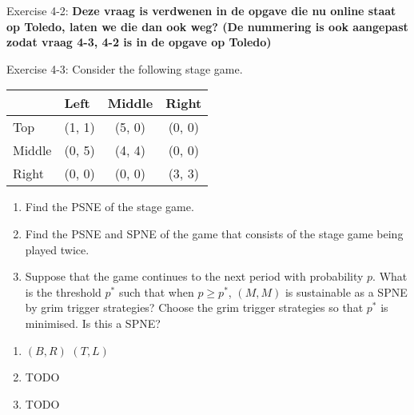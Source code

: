 \documentclass[../main.tex]{subfiles}
\begin{document}
\begin{question}
Exercise 4-2: \textbf{Deze vraag is verdwenen in de opgave die nu online staat op Toledo, laten we die dan ook weg? (De nummering is ook aangepast zodat vraag 4-3, 4-2 is in de opgave op Toledo)}
\end{question}

\begin{solution}
\end{solution}

\begin{question}

Exercise 4-3: Consider the following stage game.
\begin{table}[h]
\centering
\begin{tabular}{lccc}
                            & \multicolumn{1}{l}{Left} & \multicolumn{1}{l}{Middle} & \multicolumn{1}{l}{Right} \\ \hline
\multicolumn{1}{l|}{Top}    & (1, 1)                   & (5, 0)                     & (0, 0)                    \\
\multicolumn{1}{l|}{Middle} & (0, 5)                   & (4, 4)                     & (0, 0)                    \\
\multicolumn{1}{l|}{Right}  & (0, 0)                   & (0, 0)                     & (3, 3)                   
\end{tabular}
\end{table}

\begin{enumerate}
  \item Find the PSNE of the stage game.
  \item Find the PSNE and SPNE of the game that consists of the stage game being played twice.
  \item Suppose that the game continues to the next period with probability $p$. What is the threshold $p^*$ such that when $p \geq p^*$, $(M,M)$ is sustainable as a SPNE by grim trigger strategies? Choose the grim trigger strategies so that $p^*$ is minimised. Is this a SPNE?
\end{enumerate}

\end{question}

\begin{solution}
\begin{enumerate}
\item $(B,R)$ $(T,L)$
\item TODO
\item TODO
\end{enumerate}
\end{solution}
\end{document}
